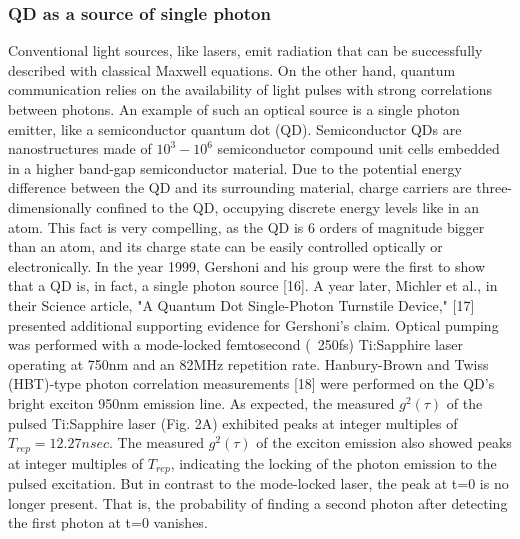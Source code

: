 \subsubsection{QD as a source of single photon}
Conventional light sources, like lasers, emit radiation that can be successfully described with classical Maxwell equations. On the other hand, quantum communication relies on the availability of light pulses with strong correlations between photons. An example of such an optical source is a single photon emitter, like a semiconductor quantum dot (QD). Semiconductor QDs are nanostructures made of $10^3-10^6$ semiconductor compound unit cells embedded in a higher band-gap semiconductor material. Due to the potential energy difference between the QD and its surrounding material, charge carriers are three-dimensionally confined to the QD, occupying discrete energy levels like in an atom. This fact is very compelling, as the QD is 6 orders of magnitude bigger than an atom, and its charge state can be easily controlled optically or electronically. 
In the year 1999, Gershoni and his group were the first to show that a QD is, in fact, a single photon source [16]. A year later, Michler et al., in their Science article, "A Quantum Dot Single-Photon Turnstile Device," [17]  presented additional supporting evidence for Gershoni's claim. Optical pumping was performed with a mode-locked femtosecond (~250fs) Ti:Sapphire laser operating at 750nm and an 82MHz repetition rate. Hanbury-Brown and Twiss (HBT)-type photon correlation measurements [18] were performed on the QD's bright exciton 950nm emission line. As expected, the measured $g^2(\tau)$  of the pulsed Ti:Sapphire laser (Fig. 2A) exhibited peaks at integer multiples of  $T_{rep} =12.27 nsec$. The measured $g^2(\tau)$ of the exciton emission also showed peaks at integer multiples of $T_{rep}$, indicating the locking of the photon emission to the pulsed excitation. But in contrast to the mode-locked laser, the peak at t=0 is no longer present. That is, the probability of finding a second photon after detecting the first photon at t=0 vanishes.
